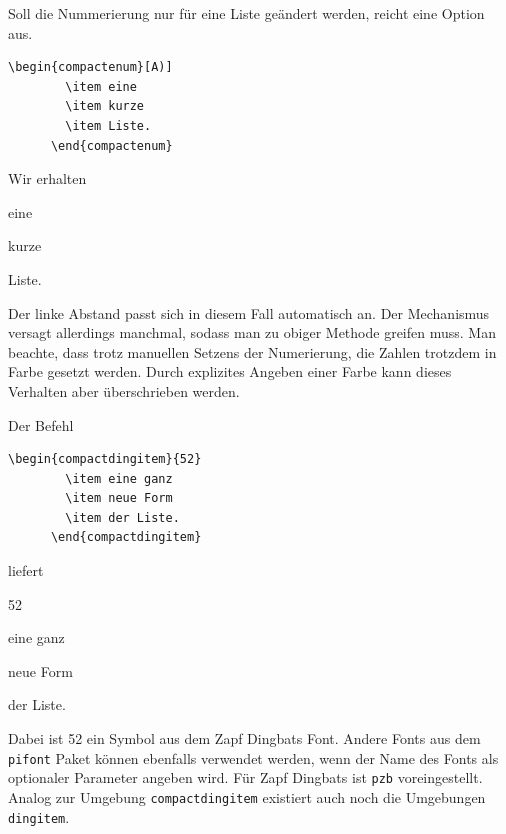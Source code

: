 \documentclass{exercise}
\begin{document}
    Soll die Nummerierung nur für eine Liste geändert werden, reicht eine Option aus.
    \begin{lstlisting}[gobble=6]
      \begin{compactenum}[A)]
        \item eine
        \item kurze
        \item Liste.
      \end{compactenum}
    \end{lstlisting}
    Wir erhalten
    \begin{compactenum}[A)]
      \item eine
      \item kurze
      \item Liste.
    \end{compactenum}
    Der linke Abstand passt sich in diesem Fall automatisch an. Der Mechanismus
    versagt allerdings manchmal, sodass man zu obiger Methode greifen muss.
    Man beachte, dass trotz manuellen Setzens
    der Numerierung, die Zahlen trotzdem in Farbe gesetzt werden. Durch explizites
    Angeben einer Farbe kann dieses Verhalten aber überschrieben werden.

    Der Befehl
    \begin{lstlisting}[gobble=6]
      \begin{compactdingitem}{52}
        \item eine ganz
        \item neue Form
        \item der Liste.
      \end{compactdingitem}
    \end{lstlisting}
    liefert
    \begin{compactdingitem}{52}
      \item eine ganz
      \item neue Form
      \item der Liste.
    \end{compactdingitem}
    Dabei ist 52 ein Symbol aus dem Zapf Dingbats Font. Andere Fonts
    aus dem \texttt{pifont} Paket können ebenfalls verwendet werden,
    wenn der Name des Fonts als optionaler Parameter angeben wird.
    Für Zapf Dingbats ist \texttt{pzb} voreingestellt.
    Analog zur Umgebung \lstinline-compactdingitem- existiert auch noch die
    Umgebungen \lstinline-dingitem-.
\end{document}
